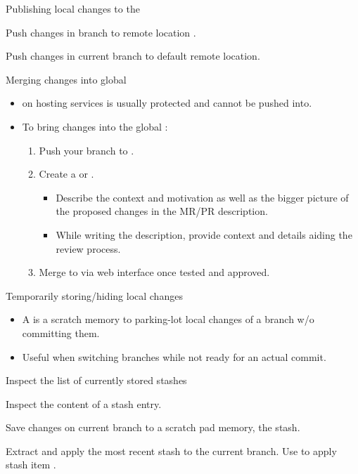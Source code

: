 \begin{frame}{Publishing local changes to the }
\begin{block}{}
Push changes in branch  to remote location .
\end{block}
\begin{block}{}
Push changes in current branch to default remote location.
\end{block}
\end{frame}

\begin{frame}{Merging changes into global }
\begin{itemize}
\item {} on hosting services is usually protected and cannot be pushed into.
\item To bring changes into the global :
\begin{enumerate}
\item Push your branch to .
\item Create a  or .
\begin{itemize}
\item Describe the context and motivation as well as the bigger picture of the proposed changes in the MR/PR description.
\item While writing the description, provide context and details aiding the review process.
\end{itemize}
\item Merge to  via web interface once tested and approved.
\end{enumerate}
\end{itemize}
\end{frame}

\begin{frame}{Temporarily storing/hiding local changes}

\begin{itemize}
\item A  is a scratch memory to parking-lot local changes of a branch w/o committing them.
\item Useful when switching branches while not ready for an actual commit.
\end{itemize}
\begin{block}{}
Inspect the list of currently stored stashes
\end{block}
\begin{block}{}
Inspect the content of a stash entry.
\end{block}
\begin{block}{}
Save changes on current branch to a scratch pad memory, {\ie} the stash.
\end{block}
\begin{block}{}
Extract and apply the most recent stash to the current branch.
Use  to apply stash item .
\end{block}
\end{frame}

